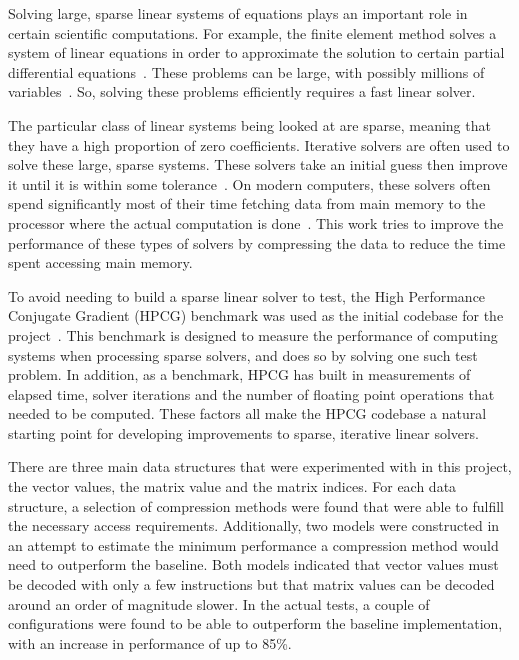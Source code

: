 Solving large, sparse linear systems of equations plays an important role in certain scientific computations.
For example, the finite element method solves a system of linear equations in order to approximate the solution to certain partial differential equations~\cite{Saad:2003:IterativeMethods}.
These problems can be large, with possibly millions of variables~\cite{Davis:2011:FloridaMatrixCollection}.
So, solving these problems efficiently requires a fast linear solver.

The particular class of linear systems being looked at are sparse, meaning that they have a high proportion of zero coefficients.
Iterative solvers are often used to solve these large, sparse systems.
These solvers take an initial guess then improve it until it is within some tolerance~\cite{Saad:2003:IterativeMethods}.
On modern computers, these solvers often spend significantly most of their time fetching data from main memory to the processor where the actual computation is done~\cite{Lawlor:2013:compression}.
This work tries to improve the performance of these types of solvers by compressing the data to reduce the time spent accessing main memory.

To avoid needing to build a sparse linear solver to test, the High Performance Conjugate Gradient (HPCG) benchmark was used as the initial codebase for the project~\cite{Dongarra:2015:HPCG}.
This benchmark is designed to measure the performance of computing systems when processing sparse solvers, and does so by solving one such test problem.
In addition, as a benchmark, HPCG has built in measurements of elapsed time, solver iterations and the number of floating point operations that needed to be computed.
These factors all make the HPCG codebase a natural starting point for developing improvements to sparse, iterative linear solvers.

There are three main data structures that were experimented with in this project, the vector values, the matrix value and the matrix indices.
For each data structure, a selection of compression methods were found that were able to fulfill the necessary access requirements.
Additionally, two models were constructed in an attempt to estimate the minimum performance a compression method would need to outperform the baseline.
Both models indicated that vector values must be decoded with only a few instructions but that matrix values can be decoded around an order of magnitude slower.
In the actual tests, a couple of configurations were found to be able to outperform the baseline implementation, with an increase in performance of up to 85\%.

